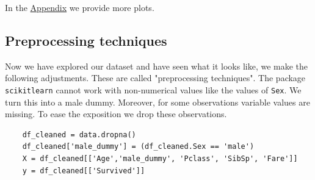 \documentclass[11pt]{article}
\begin{document}
In the \hyperref[sec:appendix]{Appendix} we provide more plots.  



\subsection{Preprocessing techniques}
\label{sec:orgb9ace53}

Now we have explored our dataset and have seen what it looks like, we make the following adjustments. These are called "preprocessing techniques". The package \texttt{scikitlearn} cannot work with non-numerical values like the values of \texttt{Sex}. We turn this into a male dummy. Moreover, for some observations variable values are missing. To ease the exposition we drop these observations. 

\begin{verbatim}
    df_cleaned = data.dropna()
    df_cleaned['male_dummy'] = (df_cleaned.Sex == 'male') 
    X = df_cleaned[['Age','male_dummy', 'Pclass', 'SibSp', 'Fare']]
    y = df_cleaned[['Survived']]
\end{verbatim}
\end{document}
